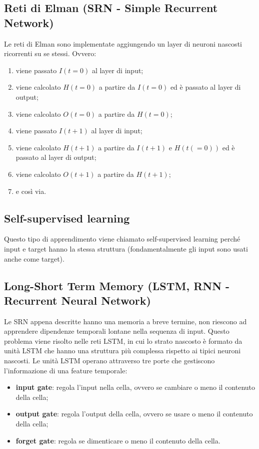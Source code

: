 \subsection{Reti di Elman (SRN - Simple Recurrent Network)}

Le reti di Elman sono implementate aggiungendo un layer di neuroni nascosti
ricorrenti su se stessi. Ovvero:
\begin{enumerate}
	\item viene passato $I(t = 0)$ al layer di input;
	\item viene calcolato $H(t = 0)$ a partire da $I(t = 0)$ ed è passato al layer di 
		output;
	\item viene calcolato $O(t = 0)$ a partire da $H(t = 0)$;
	\item viene passato $I(t + 1)$ al layer di input;
	\item viene calcolato $H(t + 1)$ a partire da $I(t + 1)$ e $H(t (= 0 ))$ ed 
		è passato al layer di output;
	\item viene calcolato $O(t + 1)$ a partire da $H(t + 1)$;
	\item e così via.
\end{enumerate}

\subsection{Self-supervised learning}

Questo tipo di apprendimento viene chiamato self-supervised learning perché
input e target hanno la stessa struttura (fondamentalmente gli input sono usati
anche come target).

\subsection{Long-Short Term Memory (LSTM, RNN - Recurrent Neural Network)}

Le SRN appena descritte hanno una memoria a breve termine, non riescono ad
apprendere dipendenze temporali lontane nella sequenza di input. 
Questo problema
viene risolto nelle reti LSTM, in cui lo strato nascosto è formato da unità LSTM
che hanno una struttura più complessa rispetto ai tipici neuroni nascosti.
Le unità LSTM operano attraverso tre porte che gestiscono l'informazione di una
feature temporale:
\begin{itemize}
	\item \textbf{input gate}: regola l'input nella cella, ovvero se cambiare o
		meno il contenuto della cella;

	\item \textbf{output gate}: regola l'output della cella, ovvero se usare o
		meno il contenuto della cella;

	\item \textbf{forget gate}: regola se dimenticare o meno il contenuto
		della cella.
\end{itemize}

